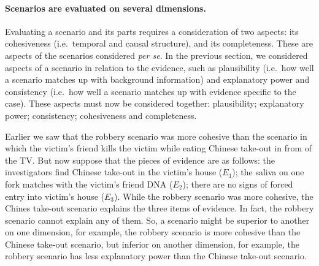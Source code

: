 \documentclass[10pt]{article}
\begin{document}
\paragraph{Scenarios are evaluated on several dimensions.} 

Evaluating a scenario and its parts requires a consideration of two aspects: its cohesiveness (i.e.\ temporal and causal structure),
and its completeness. These are aspects of the scenarios considered \textit{per se}. In the previous section, we considered 
aspects of a scenario in relation to the evidence, such as plausibility (i.e.\ how well a scenario matches up with 
background information) and explanatory power and consistency (i.e.\ how well a scenario matches up with evidence specific to the case). 
These aspects must now be considered together: plausibility; explanatory power; consistency; 
cohesiveness and completeness.

Earlier we saw that the robbery scenario was more cohesive than the scenario in which the victim's 
friend kills the victim while eating Chinese take-out in from of the TV. But now suppose that the pieces 
of evidence are as follows: the investigators find Chinese take-out in the victim's house ($E_1$); the saliva on one fork 
matches with the victim's friend DNA ($E_2$); there are no signs of forced entry into victim's house ($E_3$). While the robbery scenario was 
more cohesive, the Chines take-out scenario explains the three items of evidence. In fact, the robbery scenario cannot explain any of them. 
So, a scenario might be superior to another on one dimension, for example, the robbery scenario is 
more cohesive than the Chinese take-out scenario, but inferior on another dimension, for example, the robbery scenario 
has less explanatory power than the Chinese take-out scenario. 





\end{document}
